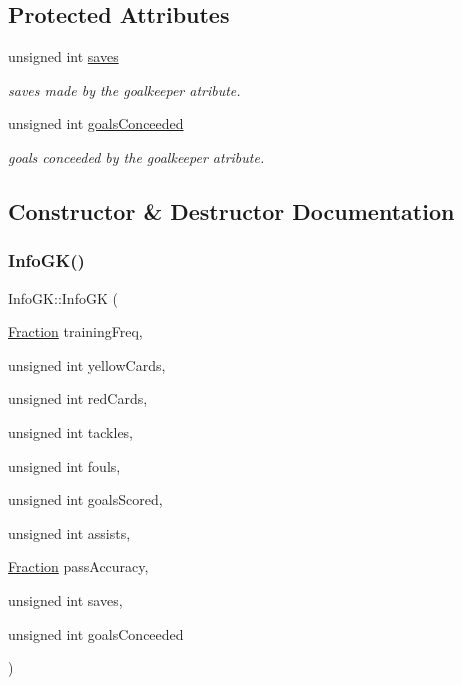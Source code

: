 \subsection*{Protected Attributes}
\begin{DoxyCompactItemize}
\item 
unsigned int \hyperlink{class_info_g_k_a0cd48fb9138effb26433639f12311794}{saves}
\begin{DoxyCompactList}\small\item\em saves made by the goalkeeper atribute. \end{DoxyCompactList}\item 
unsigned int \hyperlink{class_info_g_k_a1380b4f12dffe7a8cadd23e06e5c645f}{goals\+Conceeded}
\begin{DoxyCompactList}\small\item\em goals conceeded by the goalkeeper atribute. \end{DoxyCompactList}\end{DoxyCompactItemize}


\subsection{Constructor \& Destructor Documentation}
\hypertarget{class_info_g_k_ae71501a397ad142ce48e7136be6ebb06}{}\label{class_info_g_k_ae71501a397ad142ce48e7136be6ebb06} 
\subsubsection{\texorpdfstring{Info\+G\+K()}{InfoGK()}\hspace{0.1cm}{\footnotesize\ttfamily [1/4]}}
{\footnotesize\ttfamily Info\+G\+K\+::\+Info\+GK (\begin{DoxyParamCaption}\item[{\hyperlink{class_fraction}{Fraction}}]{training\+Freq,  }\item[{unsigned int}]{yellow\+Cards,  }\item[{unsigned int}]{red\+Cards,  }\item[{unsigned int}]{tackles,  }\item[{unsigned int}]{fouls,  }\item[{unsigned int}]{goals\+Scored,  }\item[{unsigned int}]{assists,  }\item[{\hyperlink{class_fraction}{Fraction}}]{pass\+Accuracy,  }\item[{unsigned int}]{saves,  }\item[{unsigned int}]{goals\+Conceeded }\end{DoxyParamCaption})}



